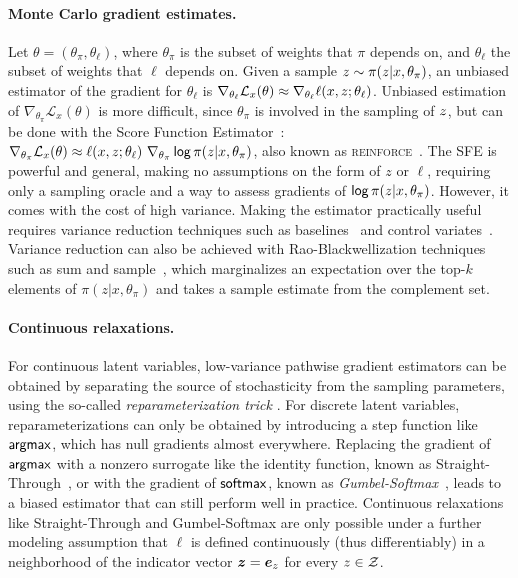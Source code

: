 \paragraph*{Monte Carlo gradient estimates.} Let $\theta=(\theta_\pi,
    \theta_\ell)$, where $\theta_\pi$ is the subset of weights that $\pi$
depends on, and $\theta_\ell$ the subset of weights that $\ell$
depends on. Given a sample $z \sim \pi(z| x,\theta_\pi)$, an
unbiased estimator of the gradient for  \wrt
$\theta_\ell$ is $\nabla_{\theta_\ell} \mathcal L_x(\theta) \approx
    \nabla_{\theta_\ell} \ell(x, z; \theta_\ell)$. Unbiased
estimation of $\nabla_{\theta_\pi} \mathcal L_x(\theta)$ is more
difficult, since $\theta_\pi$ is involved in the sampling of
$z$, but can be done with the Score Function
Estimator~\citep[SFE;][]{rubinstein1976monte,paisley2012variational}:
$\nabla_{\theta_\pi} \mathcal L_x(\theta) \approx \ell(x, z;
    \theta_\ell) ~ \nabla_{\theta_\pi} \operatorname*{\mathsf{log}} \pi(z | x, \theta_\pi)$,
also known as \textsc{reinforce}~\citep{Williams1992}. The SFE is
powerful and general, making no assumptions on the form of $z$ or
$\ell$, requiring only a sampling oracle and a way to assess
gradients of $\operatorname*{\mathsf{log}} \pi(z | x, \theta_\pi)$. However, it comes
with the cost of high variance. Making the estimator practically
useful requires variance reduction techniques such as
baselines~\citep{Williams1992,MuProp} and control
variates~\citep{CV2013,REBAR,RELAX}. Variance reduction can also be
achieved with Rao-Blackwellization techniques such as sum and
sample~\citep{casella1996rao,BBVI14,RB19}, which marginalizes an
expectation over the top-$k$ elements of $\pi(z| x,\theta_\pi)$ and
takes a sample estimate from the complement set.

\paragraph*{Continuous relaxations.} For continuous latent variables,
low-variance pathwise gradient estimators can be obtained by
separating the source of stochasticity from the sampling parameters,
using the so-called \emph{reparameterization trick}
\citep{Kingma+2014:VAE,RezendeEtAl14VAE}. For discrete latent
variables, reparameterizations can only be obtained by introducing a
step function like $\operatorname*{\mathsf{argmax}}$, which has null gradients almost everywhere.
Replacing the gradient of $\operatorname*{\mathsf{argmax}}$ with a nonzero surrogate like the identity
function, known as Straight-Through~\citep{STE}, or with the gradient of $\operatorname*{\mathsf{softmax}}$, known
as \emph{Gumbel-Softmax}~\citep{Concrete,GumbelSoftmax}, leads to a
biased estimator that can still perform well in practice. Continuous
relaxations like Straight-Through and Gumbel-Softmax are only
possible under a further modeling assumption that $\ell$ is defined
continuously (thus differentiably) in a neighborhood of the
indicator vector $\bm{z} = \bm{e}_{z}$ for every $z \in \mathcal{Z}$.

